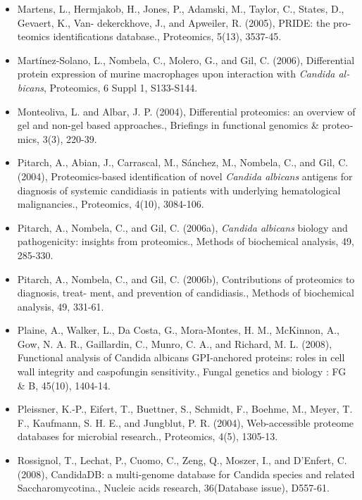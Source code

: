 \begin{otherlanguage}{british}
\begin{itemize}[leftmargin=*]
\item[]{
Martens, L., Hermjakob, H., Jones, P., Adamski, M., Taylor, C., States, D., Gevaert, K., Van-
dekerckhove, J., and Apweiler, R. (2005), PRIDE: the proteomics identifications database.,
Proteomics, 5(13), 3537-45.
}

\item[]{
Mart\'inez-Solano, L., Nombela, C., Molero, G., and Gil, C. (2006), Differential 
protein expression of murine macrophages upon interaction with \textit{Candida albicans}, Proteomics, 6 Suppl
1, S133-S144.
}

\item[]{
Monteoliva, L. and Albar, J. P. (2004), Differential proteomics: an overview of gel and non-gel
based approaches., Briefings in functional genomics \& proteomics, 3(3), 220-39.
}

\item[]{
Pitarch, A., Abian, J., Carrascal, M., S\'anchez, M., Nombela, C., and Gil, C. (2004),
Proteomics-based identification of novel \textit{Candida albicans} antigens for diagnosis 
of systemic candidiasis in patients with underlying hematological malignancies.,
Proteomics, 4(10), 3084-106.
}

\item[]{
Pitarch, A., Nombela, C., and Gil, C. (2006a), \textit{Candida albicans} biology and pathogenicity:
insights from proteomics., Methods of biochemical analysis, 49, 285-330.
}

\item[]{
Pitarch, A., Nombela, C., and Gil, C. (2006b), Contributions of proteomics to diagnosis, treat-
ment, and prevention of candidiasis., Methods of biochemical analysis, 49, 331-61.
}

\item[]{
Plaine, A., Walker, L., Da Costa, G., Mora-Montes, H. M., McKinnon, A., Gow, N. A. R., 
Gaillardin, C., Munro, C. A., and Richard, M. L. (2008), Functional analysis of Candida albicans
GPI-anchored proteins: roles in cell wall integrity and caspofungin sensitivity., 
Fungal genetics and biology : FG \& B, 45(10), 1404-14.
}

\item[]{
Pleissner, K.-P., Eifert, T., Buettner, S., Schmidt, F., Boehme, M., Meyer, T. F., Kaufmann, S.
H. E., and Jungblut, P. R. (2004), Web-accessible proteome databases for microbial 
research., Proteomics, 4(5), 1305-13.
}

\item[]{
Rossignol, T., Lechat, P., Cuomo, C., Zeng, Q., Moszer, I., and D'Enfert, C. (2008), 
CandidaDB: a multi-genome database for Candida species and related Saccharomycotina.,
Nucleic acids research, 36(Database issue), D557-61.
}


\end{itemize}
\end{otherlanguage}
